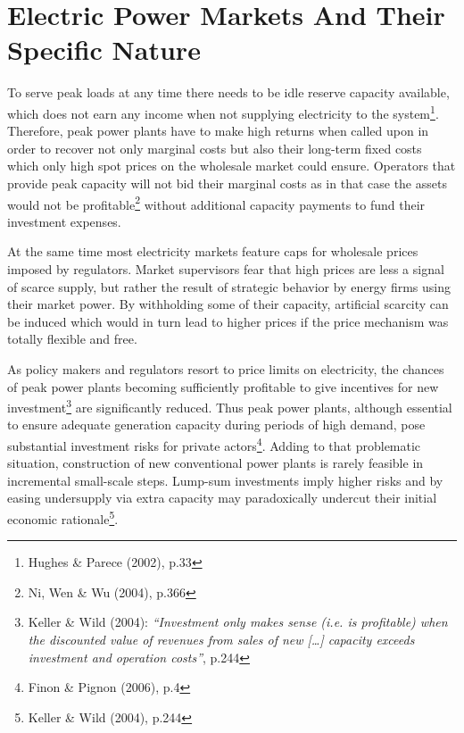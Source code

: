 \documentclass[11pt,a4paper,english]{scrreprt}
\begin{document}
  
  
  \section{Electric Power Markets And Their Specific Nature}

To serve peak loads at any time there needs to be idle reserve capacity
available, which does not earn any income when not supplying electricity to
the system\footnote{Hughes \& Parece (2002), p.33}. Therefore, peak power plants
have to make high returns when called upon in order to recover not only
marginal costs but also their long-term fixed costs which only high spot prices
on the wholesale market could ensure. Operators that provide peak capacity will
not bid their marginal costs as in that case the assets would not be
profitable\footnote{Ni, Wen \& Wu (2004), p.366} without additional capacity
payments to fund their investment expenses. 

At the same time most electricity markets feature caps for wholesale prices
imposed by regulators. Market supervisors fear that high prices are less a
signal of scarce supply, but rather the result of strategic behavior by energy
firms using their market power. By withholding some of their capacity,
artificial scarcity can be induced which would in turn lead to higher prices if
the price mechanism was totally flexible and free. 

As policy makers and regulators resort to price limits on electricity, the
chances of peak power plants becoming sufficiently profitable to give
incentives for new investment\footnote{Keller \& Wild (2004):
\textsl{\textquotedblleft Investment only makes sense (i.e. is profitable) when
the discounted value of revenues from sales of new [\dots] capacity exceeds
investment and operation costs\textquotedblright}, p.244} are significantly
reduced. Thus peak power plants, although essential to ensure adequate
generation capacity during periods of high demand, pose substantial investment
risks for private actors\footnote{Finon \& Pignon (2006), p.4}. Adding to that
problematic situation, construction of new conventional power plants is rarely
feasible in incremental small-scale steps. Lump-sum investments imply higher
risks and by easing undersupply via extra capacity may paradoxically undercut
their initial economic rationale\footnote{Keller \& Wild (2004), p.244}.\par




\end{document}
